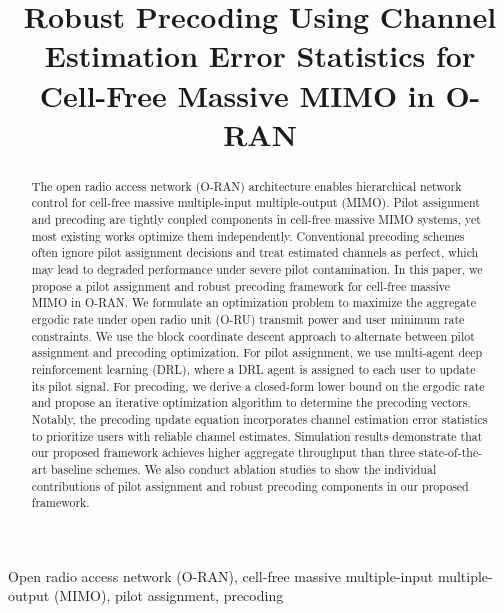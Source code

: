 \documentclass[10pt, conference]{IEEEtran}
\begin{document}
\title{Robust Precoding Using Channel Estimation Error Statistics for Cell-Free Massive MIMO in O-RAN\\}

\author{
}

\maketitle
\begin{abstract}
The open radio access network (O-RAN) architecture enables hierarchical network control for cell-free massive multiple-input multiple-output (MIMO). Pilot assignment and precoding are tightly coupled components in cell-free massive MIMO systems, yet most existing works optimize them independently. Conventional precoding schemes often ignore pilot assignment decisions and treat estimated channels as perfect, which may lead to degraded performance under severe pilot contamination. 
In this paper, we propose a pilot assignment and robust precoding framework for cell-free massive MIMO in O-RAN. We formulate an optimization problem to maximize the aggregate ergodic rate under open radio unit (O-RU) transmit power and user minimum rate constraints. We use the block coordinate descent approach to alternate between pilot assignment and precoding optimization. 
For pilot assignment, we use multi-agent deep reinforcement learning (DRL), where a DRL agent is assigned to each user to update its pilot signal. 
For precoding, we derive a closed-form lower bound on the ergodic rate and propose an iterative optimization algorithm to determine the precoding vectors. Notably, the precoding update equation incorporates channel estimation error statistics to prioritize users with reliable channel estimates. 
Simulation results demonstrate that our proposed framework achieves higher aggregate throughput than three state-of-the-art baseline schemes. We also conduct ablation studies to show the individual contributions of pilot assignment and robust precoding components in our proposed framework.
\end{abstract}
\begin{IEEEkeywords}
Open radio access network (O-RAN), cell-free massive multiple-input multiple-output (MIMO), pilot assignment, precoding
\end{IEEEkeywords}
\end{document}
